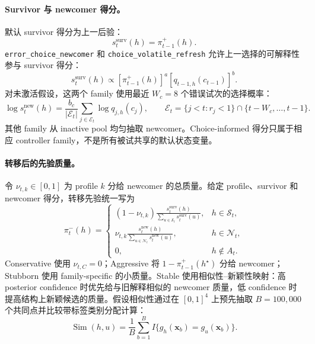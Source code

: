 \paragraph{Survivor 与 newcomer 得分。}
默认 survivor 得分为上一后验：
\[
    s_t^{\mathrm{surv}}(h)=\pi_{t-1}^+(h).
\]
\texttt{error\_choice\_newcomer} 和 \texttt{choice\_volatile\_refresh} 允许上一选择的可解释性参与 survivor 得分：
\begin{equation}
    s_t^{\mathrm{surv}}(h)
    \propto
    [\pi_{t-1}^+(h)]^a
    [q_{t-1,h}(c_{t-1})]^b .
    \label{eq:modelv2-choice-survivor}
\end{equation}
对未激活假设，这两个 family 使用最近 $W_c=8$ 个错误试次的选择概率：
\begin{equation}
    \log s_t^{\mathrm{new}}(h)
    =
    \frac{b_c}{|\mathcal E_t|}
    \sum_{j\in\mathcal E_t}
    \log q_{j,h}(c_j),
    \qquad
    \mathcal E_t=
    \{j<t:r_j<1\}\cap\{t-W_c,\ldots,t-1\}.
    \label{eq:modelv2-choice-newcomer}
\end{equation}
其他 family 从 inactive pool 均匀抽取 newcomer。Choice-informed 得分只属于相应 controller family，不是所有被试共享的默认状态变量。

\paragraph{转移后的先验质量。}
令 $\nu_{t,k}\in[0,1]$ 为 profile $k$ 分给 newcomer 的总质量。给定 profile、survivor 和 newcomer 得分，转移先验统一写为
\begin{equation}
    \pi_t^-(h)
    =
    \begin{cases}
    \displaystyle
    (1-\nu_{t,k})
    \frac{s_t^{\mathrm{surv}}(h)}
    {\sum_{u\in\mathcal S_t}s_t^{\mathrm{surv}}(u)},
    &h\in\mathcal S_t,\\[14pt]
    \displaystyle
    \nu_{t,k}
    \frac{s_t^{\mathrm{new}}(h)}
    {\sum_{u\in\mathcal N_t}s_t^{\mathrm{new}}(u)},
    &h\in\mathcal N_t,\\[12pt]
    0,&h\notin A_t .
    \end{cases}
    \label{eq:modelv2-transition-prior}
\end{equation}
Conservative 使用 $\nu_{t,C}=0$；Aggressive 将 $1-\pi_{t-1}^+(h^\star)$ 分给 newcomer；Stubborn 使用 family-specific 的小质量。Stable 使用相似性--新颖性映射：高 posterior confidence 时优先给与旧解释相似的 newcomer 质量，低 confidence 时提高结构上新颖候选的质量。假设相似性通过在 $[0,1]^4$ 上预先抽取 $B=100{,}000$ 个共同点并比较带标签类别分配计算：
\begin{equation}
    \operatorname{Sim}(h,u)
    =
    \frac{1}{B}
    \sum_{b=1}^{B}
    I\{g_h(\mathbf x_b)=g_u(\mathbf x_b)\}.
    \label{eq:modelv2-hypothesis-similarity}
\end{equation}

